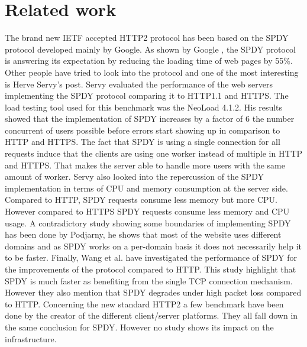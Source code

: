 \section{Related work}
\label{relwork}
The brand new IETF accepted HTTP2 protocol has been based on the SPDY protocol developed mainly by Google. As shown by Google \cite{google2x}, the SPDY protocol is answering its expectation by reducing the loading time of web pages by 55\%. Other people have tried to look into the protocol and one of the most interesting is Herve Servy's post\cite{servy}. Servy evaluated the performance of the web servers implementing the SPDY protocol comparing it to HTTP1.1 and HTTPS. The load testing tool used for this benchmark was the NeoLoad 4.1.2. His results showed that the implementation of SPDY increases by a factor of 6 the number concurrent of users possible before errors start showing up in comparison to HTTP and HTTPS. The fact that SPDY is using a single connection for all requests induce that the clients are using one worker instead of multiple in HTTP and HTTPS. That makes the server able to handle more users with the same amount of worker. Servy also looked into the repercussion of the SPDY implementation in terms of CPU and memory consumption at the server side. Compared to HTTP, SPDY requests consume less memory but more CPU. However compared to HTTPS SPDY requests consume less memory and CPU usage.
A contradictory study showing some boundaries of implementing SPDY has been done by Podjarny\cite{podiatry}, he shows that most of the website uses different domains and as SPDY works on a per-domain basis it does not necessarily help it to be faster. Finally, Wang et al.\cite{wang} have investigated the performance of SPDY for the improvements of the protocol compared to HTTP. This study highlight that SPDY is much faster as benefiting from the single TCP connection mechanism. However they also mention that SPDY degrades under high packet loss compared to HTTP. 
Concerning the new standard HTTP2 a few benchmark have been done by the creator of the different client/server platforms. They all fall down in the same conclusion for SPDY. However no study shows its impact on the infrastructure.